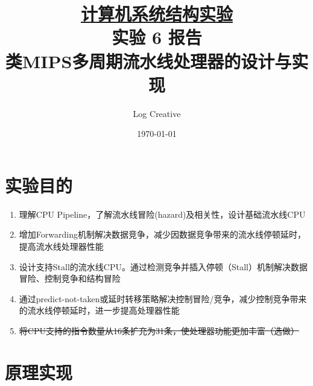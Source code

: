 \documentclass[a4paper,UTF8]{ctexart}
\begin{document}
\title{\normalsize \underline{计算机系统结构实验}\\\LARGE 实验 6 报告\\\vspace*{1em}\normalsize 类MIPS多周期流水线处理器的设计与实现}
\author{Log Creative}
\date{\today}
\maketitle
\tableofcontents
\clearpage

\section{实验目的}

\begin{enumerate}
    \item 理解CPU Pipeline，了解流水线冒险(hazard)及相关性，设计基础流水线CPU
    \item 增加Forwarding机制解决数据竞争，减少因数据竞争带来的流水线停顿延时，提高流水线处理器性能
    \item 设计支持Stall的流水线CPU。通过检测竞争并插入停顿（Stall）机制解决数据冒险、控制竞争和结构冒险
    \item 通过predict-not-taken或延时转移策略解决控制冒险/竞争，减少控制竞争带来的流水线停顿延时，进一步提高处理器性能
    \item \sout{将CPU支持的指令数量从16条扩充为31条，使处理器功能更加丰富（选做）}
\end{enumerate}

\section{原理实现}
\end{document}
